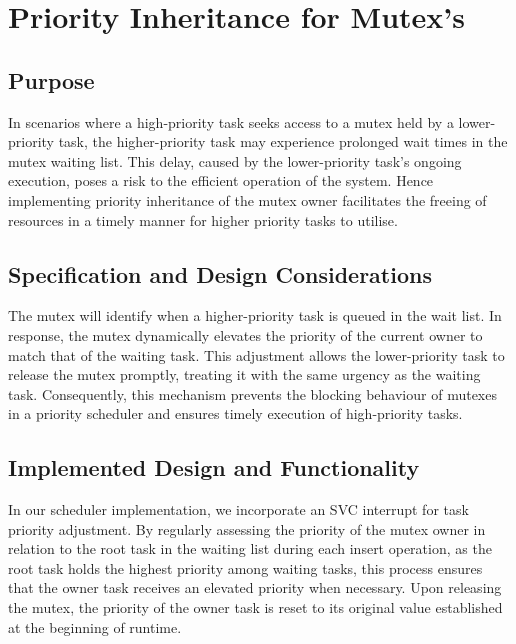 \section{Priority Inheritance for Mutex's}
\subsection{Purpose}
In scenarios where a high-priority task seeks access to a mutex held by a lower-priority task, the higher-priority task may experience prolonged wait times in the mutex waiting list. This delay, caused by the lower-priority task's ongoing execution, poses a risk to the efficient operation of the system. Hence implementing priority inheritance of the mutex owner facilitates the freeing of resources in a timely manner for higher priority tasks to utilise.

\subsection{Specification and Design Considerations}
The mutex will identify when a higher-priority task is queued in the wait list. In response, the mutex dynamically elevates the priority of the current owner to match that of the waiting task. This adjustment allows the lower-priority task to release the mutex promptly, treating it with the same urgency as the waiting task. Consequently, this mechanism prevents the blocking behaviour of mutexes in a priority scheduler and ensures timely execution of high-priority tasks.

\subsection{Implemented Design and Functionality}
In our scheduler implementation, we incorporate an SVC interrupt for task priority adjustment. By regularly assessing the priority of the mutex owner in relation to the root task in the waiting list during each insert operation, as the root task holds the highest priority among waiting tasks, this process ensures that the owner task receives an elevated priority when necessary. Upon releasing the mutex, the priority of the owner task is reset to its original value established at the beginning of runtime.
